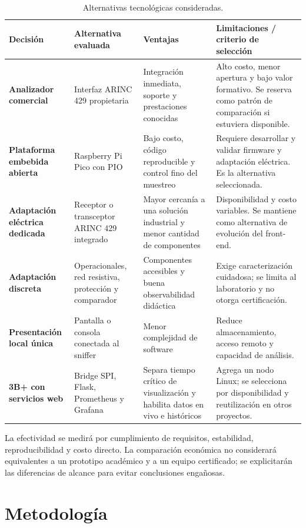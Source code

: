 \documentclass[12pt,a4paper,oneside]{article}
\begin{document}
\begin{table}[H]
  \centering
  \small
  \begin{tabularx}{\textwidth}{>{\bfseries}p{3.1cm}X X X}
    \toprule
    Decisión & Alternativa evaluada & Ventajas & Limitaciones / criterio de selección \\
    \midrule
    Analizador comercial & Interfaz ARINC 429 propietaria & Integración inmediata, soporte y prestaciones conocidas & Alto costo, menor apertura y bajo valor formativo. Se reserva como patrón de comparación si estuviera disponible. \\
    Plataforma embebida abierta & Raspberry Pi Pico con PIO & Bajo costo, código reproducible y control fino del muestreo & Requiere desarrollar y validar firmware y adaptación eléctrica. Es la alternativa seleccionada. \\
    Adaptación eléctrica dedicada & Receptor o transceptor ARINC 429 integrado & Mayor cercanía a una solución industrial y menor cantidad de componentes & Disponibilidad y costo variables. Se mantiene como alternativa de evolución del front-end. \\
    Adaptación discreta & Operacionales, red resistiva, protección y comparador & Componentes accesibles y buena observabilidad didáctica & Exige caracterización cuidadosa; se limita al laboratorio y no otorga certificación. \\
    Presentación local única & Pantalla o consola conectada al sniffer & Menor complejidad de software & Reduce almacenamiento, acceso remoto y capacidad de análisis. \\
    3B+ con servicios web & Bridge SPI, Flask, Prometheus y Grafana & Separa tiempo crítico de visualización y habilita datos en vivo e históricos & Agrega un nodo Linux; se selecciona por disponibilidad y reutilización en otros proyectos. \\
    \bottomrule
  \end{tabularx}
  \caption{Alternativas tecnológicas consideradas.}
  \label{tab:alternativas}
\end{table}

La efectividad se medirá por cumplimiento de requisitos, estabilidad, reproducibilidad y costo directo. La comparación económica no considerará equivalentes a un prototipo académico y a un equipo certificado; se explicitarán las diferencias de alcance para evitar conclusiones engañosas.

\section{Metodología}
\end{document}
